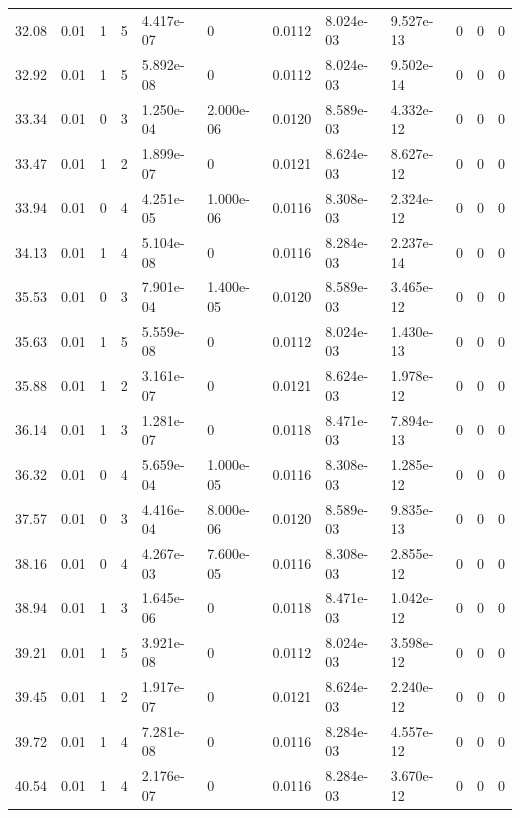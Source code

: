 \documentclass[preview]{standalone}
\begin{document}
{{{\begin{tabular}{L{1.2cm}C{1.2cm} C{0.3cm}C{0.5cm} C{1.4cm}C{1.4cm} C{1.4cm}C{1.4cm} C{1.6cm}C{1.6cm} C{1.6cm}C{1.6cm}}
  32.08  &  0.01  & 1     &  5 &  4.417e-07  & 0  &  0.0112&   8.024e-03& 9.527e-13 & 0   &  0 & 0  \\ 
  32.92  &  0.01  & 1     &  5 &  5.892e-08  & 0  &  0.0112&   8.024e-03& 9.502e-14 & 0   &  0 & 0  \\ 
  33.34  &  0.01  & 0     &  3 &  1.250e-04  & 2.000e-06  &  0.0120&   8.589e-03& 4.332e-12 & 0   &  0 & 0  \\ 
  33.47  &  0.01  & 1     &  2 &  1.899e-07  & 0  &  0.0121&   8.624e-03& 8.627e-12 & 0   &  0 & 0  \\ 
  33.94  &  0.01  & 0     &  4 &  4.251e-05  & 1.000e-06  &  0.0116&   8.308e-03& 2.324e-12 & 0   &  0 & 0  \\ 
  34.13  &  0.01  & 1     &  4 &  5.104e-08  & 0  &  0.0116&   8.284e-03& 2.237e-14 & 0   &  0 & 0  \\ 
  35.53  &  0.01  & 0     &  3 &  7.901e-04  & 1.400e-05  &  0.0120&   8.589e-03& 3.465e-12 & 0   &  0 & 0  \\ 
  35.63  &  0.01  & 1     &  5 &  5.559e-08  & 0  &  0.0112&   8.024e-03& 1.430e-13 & 0   &  0 & 0  \\ 
  35.88  &  0.01  & 1     &  2 &  3.161e-07  & 0  &  0.0121&   8.624e-03& 1.978e-12 & 0   &  0 & 0  \\ 
  36.14  &  0.01  & 1     &  3 &  1.281e-07  & 0  &  0.0118&   8.471e-03& 7.894e-13 & 0   &  0 & 0  \\ 
  36.32  &  0.01  & 0     &  4 &  5.659e-04  & 1.000e-05  &  0.0116&   8.308e-03& 1.285e-12 & 0   &  0 & 0  \\ 
  37.57  &  0.01  & 0     &  3 &  4.416e-04  & 8.000e-06  &  0.0120&   8.589e-03& 9.835e-13 & 0   &  0 & 0  \\ 
  38.16  &  0.01  & 0     &  4 &  4.267e-03  & 7.600e-05  &  0.0116&   8.308e-03& 2.855e-12 & 0   &  0 & 0  \\ 
  38.94  &  0.01  & 1     &  3 &  1.645e-06  & 0  &  0.0118&   8.471e-03& 1.042e-12 & 0   &  0 & 0  \\ 
  39.21  &  0.01  & 1     &  5 &  3.921e-08  & 0  &  0.0112&   8.024e-03& 3.598e-12 & 0   &  0 & 0  \\ 
  39.45  &  0.01  & 1     &  2 &  1.917e-07  & 0  &  0.0121&   8.624e-03& 2.240e-12 & 0   &  0 & 0  \\ 
  39.72  &  0.01  & 1     &  4 &  7.281e-08  & 0  &  0.0116&   8.284e-03& 4.557e-12 & 0   &  0 & 0  \\ 
  40.54  &  0.01  & 1     &  4 &  2.176e-07  & 0  &  0.0116&   8.284e-03& 3.670e-12 & 0   &  0 & 0  \\ 

\end{tabular}}}}
\end{document}
